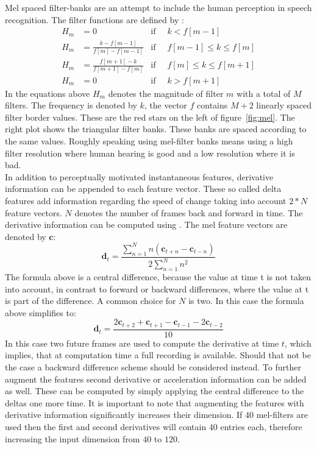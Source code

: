 Mel spaced filter-banks are an attempt to include the human perception in speech recognition. The filter functions are defined by \cite[page 317]{Huang2001}:
\begin{align}
H_m &= 0 									   &\text{if}\;\; & k < f[m-1] \\
H_m &= \frac{k      - f[m-1] }{f[m] - f[m-1]}  &\text{if}\;\; & f[m-1] \leq k \leq f[m] \\
H_m &= \frac{f[m+1] - k      }{f[m + 1] - f[m]}&\text{if}\;\; & f[m] \leq k \leq f[m+1] \\
H_m &= 0									   &\text{if}\;\; & k > f[m+1]
\end{align}
In the equations above $H_m$ denotes the magnitude of filter $m$ with a total of $M$ filters. The frequency is denoted by $k$, the vector $f$ contains $M+2$ linearly spaced filter border values. These are the red stars on the left of  figure~\ref{fig:mel}. The right plot shows the triangular filter banks. These banks are spaced according to the same values. Roughly speaking using mel-filter banks means using a high filter resolution where human hearing is good and a low resolution where it is bad. \\
In addition to perceptually motivated instantaneous features, derivative information can be appended to each feature vector. These so called delta features add information
regarding the speed of change taking into account $2*N$ feature vectors. $N$ denotes the number of frames back and forward in time. The derivative information can be computed using \cite{Woodland2006}. The mel feature vectors are denoted by $\mathbf{c}$:
\begin{equation}
\mathbf{d}_t = \frac{\sum\limits_{n=1}^{N} n (\mathbf{c}_{t+n}- \mathbf{c}_{t-n})}{2 \sum\limits_{n=1}^{N} n^2}
\end{equation}
The formula above is a central difference, because the value at time t is not taken into account, in contrast to forward or backward differences, where the value at t is part of the difference. A common choice for $N$ is two. In this case the formula above simplifies to:
\begin{equation}
\mathbf{d}_t = \frac{2\mathbf{c}_{t+2} + \mathbf{c}_{t+1} - \mathbf{c}_{t-1} - 2\mathbf{c}_{t-2}}{10}
\end{equation}
In this case two future frames are used to compute the derivative at time $t$, which implies, that at computation time a full recording is available. Should that not be the case a backward difference scheme should be considered instead. To further augment the features second derivative or acceleration information can be added as well. These can be computed by simply applying the central difference to the deltas one more time. It is important to note that augmenting the features with derivative information significantly increases their dimension. If 40 mel-filters are used then the first and second derivatives will contain 40 entries each, therefore increasing the input dimension from $40$ to $120$.


